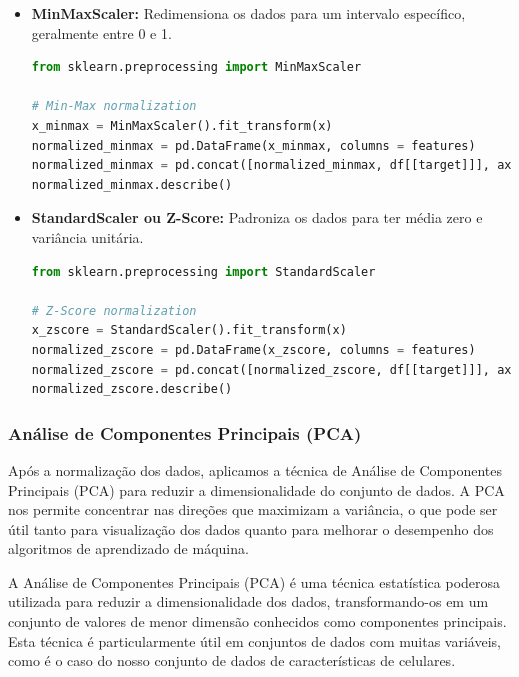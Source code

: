 \documentclass[conference]{IEEEtran}
\begin{document}
\begin{itemize}
    \item {\textbf{MinMaxScaler:}}
    Redimensiona os dados para um intervalo específico, 
    geralmente entre 0 e 1.

    \begin{lstlisting}[language=Python]
from sklearn.preprocessing import MinMaxScaler

# Min-Max normalization
x_minmax = MinMaxScaler().fit_transform(x)
normalized_minmax = pd.DataFrame(x_minmax, columns = features)
normalized_minmax = pd.concat([normalized_minmax, df[[target]]], axis = 1)
normalized_minmax.describe()
    \end{lstlisting}

    \item {\textbf{StandardScaler ou Z-Score:}}
    Padroniza os dados para ter média zero e variância unitária.

    \begin{lstlisting}[language=Python]
from sklearn.preprocessing import StandardScaler

# Z-Score normalization
x_zscore = StandardScaler().fit_transform(x)
normalized_zscore = pd.DataFrame(x_zscore, columns = features)
normalized_zscore = pd.concat([normalized_zscore, df[[target]]], axis = 1)
normalized_zscore.describe()
    \end{lstlisting}
\end{itemize}

\subsubsection{Análise de Componentes Principais (PCA)}

Após a normalização dos dados, aplicamos a técnica de 
Análise de Componentes Principais (PCA) para reduzir a 
dimensionalidade do conjunto de dados. 
A PCA nos permite concentrar nas direções que maximizam a variância, 
o que pode ser útil tanto para visualização dos dados 
quanto para melhorar o desempenho dos algoritmos de aprendizado de máquina.

A Análise de Componentes Principais (PCA) é uma técnica estatística poderosa 
utilizada para reduzir a dimensionalidade dos dados, transformando-os em um 
conjunto de valores de menor dimensão conhecidos como componentes principais. 
Esta técnica é particularmente útil em conjuntos de dados com muitas variáveis, 
como é o caso do nosso conjunto de dados de características de celulares. 
\end{document}
